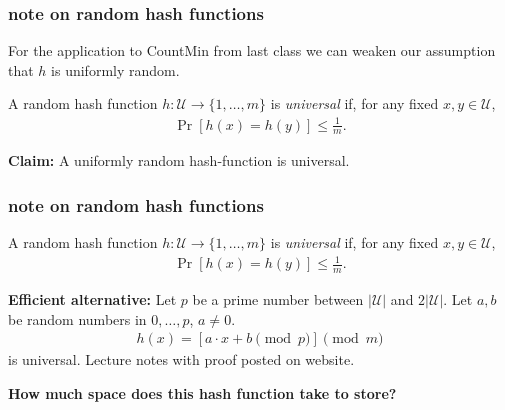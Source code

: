 \documentclass[handout,compress]{beamer}
\begin{document}
	\begin{frame}[t]
	\frametitle{note on random hash functions}
	For the application to CountMin from last class we can weaken our assumption that $h$ is uniformly random.
	\begin{definition}
		A random hash function $h: \mathcal{U} \rightarrow \{1, \ldots, m\}$ is \emph{universal} if, for any fixed $x,y\in \mathcal{U}$,
		\begin{align*}
			\Pr[h(x) = h(y)] \leq \frac{1}{m}.
		\end{align*}
	\end{definition}
	\textbf{Claim:} A uniformly random hash-function is universal. 

\end{frame}

	\begin{frame}
	\frametitle{note on random hash functions}
	\begin{definition}
		A random hash function $h: \mathcal{U} \rightarrow \{1, \ldots, m\}$ is \emph{universal} if, for any fixed $x,y\in \mathcal{U}$,\vspace{-1.5em}
		\begin{align*}
			\Pr[h(x) = h(y)] \leq \frac{1}{m}.
		\end{align*}
	\end{definition}
	\textbf{Efficient alternative:} Let $p$ be a prime number between $|\mathcal{U}|$ and $2|\mathcal{U}|$. Let $a,b$ be random numbers in $0,\ldots, p$, $a\neq 0$.
	\begin{align*}
		h(x) = \left[a\cdot x + b \pmod{p}\right] \pmod{m}
	\end{align*} 
	is universal. Lecture notes with proof posted on website. 
	
	\begin{center}
	\textbf{How much space does this hash function take to store?}
	\end{center}
\end{frame}
\end{document}
